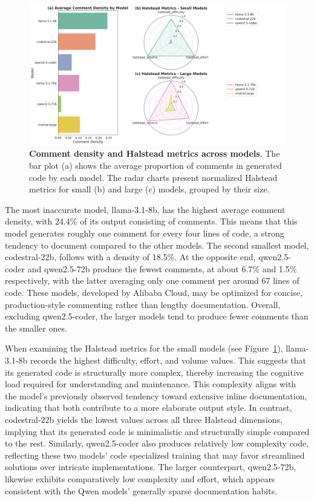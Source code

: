 \documentclass{DESSThesis}
\begin{document}
\begin{figure}[!b]
    \centering
    \includegraphics[width=\linewidth]{img/Results/First Experimental Phase/Comment_Density_and_Halstead_Radar.png}
    \caption[Comment density and Halstead metrics across models]{\textbf{Comment density and Halstead metrics across models}. The bar plot (a) shows the average proportion of comments in generated code by each model. The radar charts present normalized Halstead metrics for small (b) and large (c) models, grouped by their size.}
    \label{fig:comment_density_and_halstead}
\end{figure}

The most inaccurate model, llama-3.1-8b, has the highest average comment density, with 24.4\% of its output consisting of comments. This means that this model generates roughly one comment for every four lines of code, a strong tendency to document compared to the other models. The second smallest model, codestral-22b, follows with a density of 18.5\%. At the opposite end, qwen2.5-coder and qwen2.5-72b produce the fewest comments, at about 6.7\% and 1.5\% respectively, with the latter averaging only one comment per around 67 lines of code. These models, developed by Alibaba Cloud, may be optimized for concise, production-style commenting rather than lengthy documentation. Overall, excluding qwen2.5-coder, the larger models tend to produce fewer comments than the smaller ones. 


When examining the Halstead metrics for the small models (see Figure~\ref{fig:comment_density_and_halstead}), llama-3.1-8b records the highest difficulty, effort, and volume values. This suggests that its generated code is structurally more complex, thereby increasing the cognitive load required for understanding and maintenance. This complexity aligns with the model's previously observed tendency toward extensive inline documentation, indicating that both contribute to a more elaborate output style. In contrast, codestral-22b yields the lowest values across all three Halstead dimensions, implying that its generated code is minimalistic and structurally simple compared to the rest. Similarly, qwen2.5-coder also produces relatively low complexity code, reflecting these two models' code specialized training that may favor streamlined solutions over intricate implementations. The larger counterpart, qwen2.5-72b, likewise exhibits comparatively low complexity and effort, which appears consistent with the Qwen models' generally sparse documentation habits.
\end{document}
